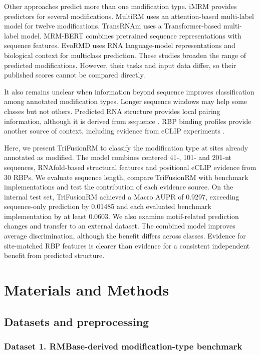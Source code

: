 \documentclass[unnumsec,webpdf,contemporary,large]{oup-authoring-template}
\begin{document}
Other approaches predict more than one modification type. iMRM \citep{ref15} provides predictors for several modifications. MultiRM \citep{ref16} uses an attention-based multi-label model for twelve modifications. TransRNAm \citep{ref17} uses a Transformer-based multi-label model. MRM-BERT \citep{ref18} combines pretrained sequence representations with sequence features. EvoRMD \citep{ref19} uses RNA language-model representations and biological context for multiclass prediction. These studies broaden the range of predicted modifications. However, their tasks and input data differ, so their published scores cannot be compared directly.

It also remains unclear when information beyond sequence improves classification among annotated modification types. Longer sequence windows may help some classes but not others. Predicted RNA structure provides local pairing information, although it is derived from sequence \citep{ref20}. RBP binding profiles provide another source of context, including evidence from eCLIP experiments \citep{ref23}. 

Here, we present TriFusionRM to classify the modification type at sites already annotated as modified. The model combines centered 41-, 101- and 201-nt sequences, RNAfold-based structural features and positional eCLIP evidence from 30 RBPs. We evaluate sequence length, compare TriFusionRM with benchmark implementations and test the contribution of each evidence source. On the internal test set, TriFusionRM achieved a Macro AUPR of 0.9297, exceeding sequence-only prediction by 0.01485 and each evaluated benchmark implementation by at least 0.0603. We also examine motif-related prediction changes and transfer to an external dataset. The combined model improves average discrimination, although the benefit differs across classes. Evidence for site-matched RBP features is clearer than evidence for a consistent independent benefit from predicted structure.

\section{Materials and Methods}

\subsection{Datasets and preprocessing}

\subsubsection{Dataset 1. RMBase-derived modification-type benchmark}
\end{document}
